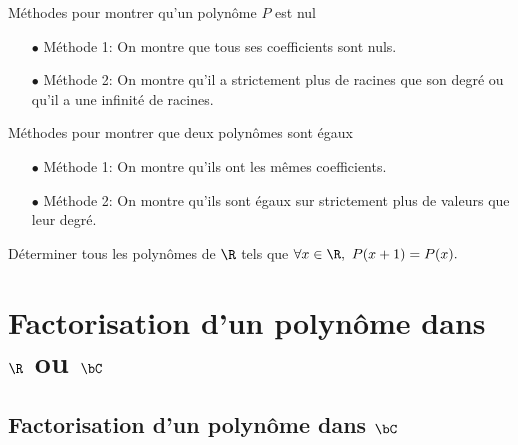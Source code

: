 \documentclass[a4paper, 11pt,reqno]{article}
\begin{document}
\colorbox{gray!30}{M\'ethodes pour montrer qu'un polyn\^ome $P$ est nul}\\

\begin{dboxminipage}{0.9\textwidth}
	\begin{itemize}
		\item[$\bullet$] M\'ethode 1: On montre que tous ses coefficients sont nuls.
		\item[$\bullet$] M\'ethode 2: On montre qu'il a strictement plus de racines que son degr\'e ou qu'il a une infinit\'e de racines.
	\end{itemize}
\end{dboxminipage}



\vspace{1cm}

\colorbox{gray!30}{M\'ethodes pour montrer que deux polyn\^omes sont \'egaux}\\


\begin{dboxminipage}{0.9\textwidth}
	\begin{itemize}
		\item[$\bullet$] M\'ethode 1: On montre qu'ils ont les m\^emes coefficients.
		\item[$\bullet$] M\'ethode 2: On montre qu'ils sont \'egaux sur strictement plus de valeurs que leur degr\'e.
	\end{itemize}

\end{dboxminipage}


{\footnotesize
\begin{exercice}
	D\'eterminer tous les polyn\^omes de $\R$ tels que $\forall x\in\R,\ P(x+1)=P(x).$
\end{exercice}
}

\section{Factorisation d'un polyn\^ome dans $\R$ ou $\bC$}

\subsection{Factorisation d'un polyn\^ome dans $\bC$}
\end{document}
